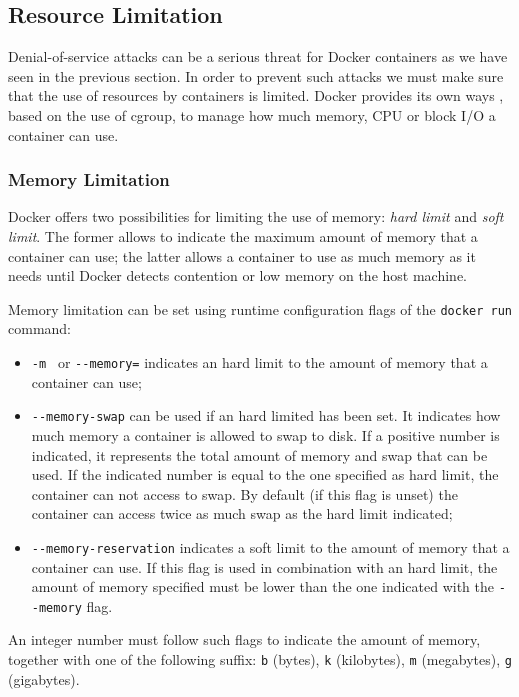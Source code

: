 \documentclass[a4paper,12pt]{article}
\newcommand{\code}[1]{\lstinline|#1|}
\begin{document}
\subsection{Resource Limitation}

Denial-of-service attacks can be a serious threat for Docker containers as we
have seen in the previous section. In order to prevent such attacks we must make
sure that the use of resources by containers is limited. Docker provides its own
ways \cite{resource_on_docker}, based on the use of cgroup, to manage
how much memory, CPU or block I/O a container can use.

\subsubsection{Memory Limitation}

Docker offers two possibilities for limiting the use of memory: \textit{hard
limit} and \textit{soft limit}. The former allows to indicate the maximum amount
of memory that a container can use; the latter allows a container to
use as much memory as it needs until Docker detects contention or low memory on
the host machine. \par Memory limitation can be set using runtime configuration
flags of the \code{docker run} command: 
\begin{itemize}
  \item \code{-m } or \code{--memory=} indicates an hard limit to the amount
  of memory that a container can use;
  \item \code{--memory-swap} can be used if an hard limited has been set. It
  indicates how much memory a container is allowed to swap to disk. If a
  positive number is indicated, it represents the total amount of memory and
  swap that can be used. If the indicated number is equal to the one specified
  as hard limit, the container can not access to swap. By default (if this flag is
  unset) the container can access twice as much swap as the hard limit indicated;
  \item \code{--memory-reservation} indicates a soft limit to the amount
  of memory that a container can use. If this flag is used in combination with
  an hard limit, the amount of memory specified must be lower than the one
  indicated with the \code{--memory} flag.
\end{itemize}
An integer number must follow such flags to indicate the amount of memory,
together with one of the following suffix: \code{b} (bytes), \code{k}
(kilobytes), \code{m} (megabytes), \code{g} (gigabytes).
  
\end{document}

